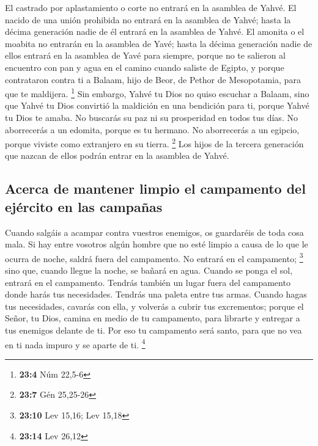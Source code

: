  El castrado por aplastamiento o corte no entrará en la
asamblea de Yahvé.  El nacido de una unión prohibida no
entrará en la asamblea de Yahvé; hasta la décima generación nadie de él
entrará en la asamblea de Yahvé.  El amonita o el moabita
no entrarán en la asamblea de Yavé; hasta la décima generación nadie de
ellos entrará en la asamblea de Yavé para siempre,  porque
no te salieron al encuentro con pan y agua en el camino cuando saliste
de Egipto, y porque contrataron contra ti a Balaam, hijo de Beor, de
Pethor de Mesopotamia, para que te maldijera. \footnote{\textbf{23:4}
  Núm 22,5-6}  Sin embargo, Yahvé tu Dios no quiso
escuchar a Balaam, sino que Yahvé tu Dios convirtió la maldición en una
bendición para ti, porque Yahvé tu Dios te amaba.  No
buscarás su paz ni su prosperidad en todos tus días.  No
aborrecerás a un edomita, porque es tu hermano. No aborrecerás a un
egipcio, porque viviste como extranjero en su tierra. \footnote{\textbf{23:7}
  Gén 25,25-26}  Los hijos de la tercera generación que
nazcan de ellos podrán entrar en la asamblea de Yahvé.

\hypertarget{acerca-de-mantener-limpio-el-campamento-del-ejuxe9rcito-en-las-campauxf1as}{%
\subsection{Acerca de mantener limpio el campamento del ejército en las
campañas}\label{acerca-de-mantener-limpio-el-campamento-del-ejuxe9rcito-en-las-campauxf1as}}

 Cuando salgáis a acampar contra vuestros enemigos, os
guardaréis de toda cosa mala.  Si hay entre vosotros
algún hombre que no esté limpio a causa de lo que le ocurra de noche,
saldrá fuera del campamento. No entrará en el campamento; \footnote{\textbf{23:10}
  Lev 15,16; Lev 15,18}  sino que, cuando llegue la
noche, se bañará en agua. Cuando se ponga el sol, entrará en el
campamento.  Tendrás también un lugar fuera del
campamento donde harás tus necesidades.  Tendrás una
paleta entre tus armas. Cuando hagas tus necesidades, cavarás con ella,
y volverás a cubrir tus excrementos;  porque el Señor, tu
Dios, camina en medio de tu campamento, para librarte y entregar a tus
enemigos delante de ti. Por eso tu campamento será santo, para que no
vea en ti nada impuro y se aparte de ti. \footnote{\textbf{23:14} Lev
  26,12}

